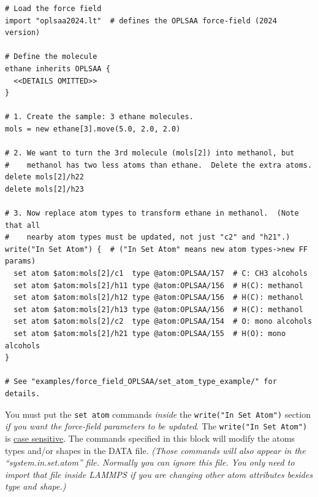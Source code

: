 \documentclass[11pt]{article}
\newcommand{\vitem}{\item[] \hspace{-27.5pt}}
\begin{document}
\begin{verbatim}
# Load the force field
import "oplsaa2024.lt"  # defines the OPLSAA force-field (2024 version)

# Define the molecule
ethane inherits OPLSAA {
  <<DETAILS OMITTED>>
}

# 1. Create the sample: 3 ethane molecules.
mols = new ethane[3].move(5.0, 2.0, 2.0)

# 2. We want to turn the 3rd molecule (mols[2]) into methanol, but
#    methanol has two less atoms than ethane.  Delete the extra atoms.
delete mols[2]/h22
delete mols[2]/h23

# 3. Now replace atom types to transform ethane in methanol.  (Note that all
#    nearby atom types must be updated, not just "c2" and "h21".)
write("In Set Atom") {  # ("In Set Atom" means new atom types->new FF params)
  set atom $atom:mols[2]/c1  type @atom:OPLSAA/157  # C: CH3 alcohols
  set atom $atom:mols[2]/h11 type @atom:OPLSAA/156  # H(C): methanol
  set atom $atom:mols[2]/h12 type @atom:OPLSAA/156  # H(C): methanol
  set atom $atom:mols[2]/h13 type @atom:OPLSAA/156  # H(C): methanol
  set atom $atom:mols[2]/c2  type @atom:OPLSAA/154  # O: mono alcohols
  set atom $atom:mols[2]/h21 type @atom:OPLSAA/155  # H(O): mono alcohols
}

# See "examples/force_field_OPLSAA/set_atom_type_example/" for details.
\end{verbatim}


\begin{warning}  
   You must put the \verb|set atom| commands \textit{inside} the \verb|write("In Set Atom")| section \textit{if you want the force-field parameters to be updated}.  The \verb|write("In Set Atom")| is \underline{case sensitive}. The commands specified in this block will modify the atoms types and/or shapes in the DATA file.  \textit{(Those commands will also appear in the ``system.in.set.atom'' file.  Normally you can ignore this file.  You only need to import that file inside LAMMPS if you are changing other atom attributes besides type and shape.)}
\end{warning}


\end{document}
